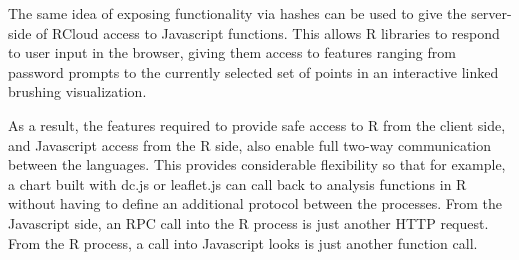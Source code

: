 The same idea of exposing functionality via hashes can be used to give
the server-side of RCloud access to Javascript functions. This allows
R libraries to respond to user input in the browser, giving them
access to features ranging from password prompts to the currently
selected set of points in an interactive linked brushing
visualization.

As a result, the features required to provide safe access to R from
the client side, and Javascript access from the R side, also enable
full two-way communication between the languages.  This provides
considerable flexibility so that for example, a chart built with dc.js
or leaflet.js can call back to analysis functions in R without having
to define an additional protocol between the processes. From the
Javascript side, an RPC call into the R process is just another HTTP
request. From the R process, a call into Javascript looks is just
another function call.
